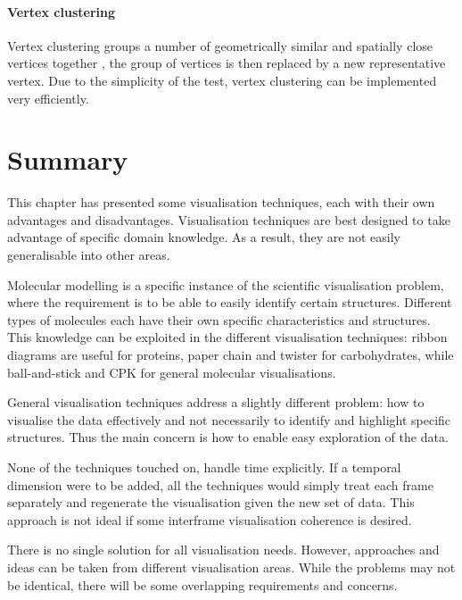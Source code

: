 
\paragraph{Vertex clustering}

Vertex clustering groups a number of geometrically similar and spatially close
vertices together \citep{rossignac93}, the group of vertices is then replaced
by a new representative vertex. Due to the simplicity of the test, vertex
clustering can be implemented very efficiently.



\section{Summary}
\label{sec:background_summary}

This chapter has presented some visualisation techniques, each with their own
advantages and disadvantages. Visualisation techniques are best designed to
take advantage of specific domain knowledge. As a result, they are not easily
generalisable into other areas.

Molecular modelling is a specific instance of the scientific visualisation
problem, where the requirement is to be able to easily identify certain
structures. Different types of molecules each have their own specific
characteristics and structures. This knowledge can be exploited in the
different visualisation techniques: ribbon diagrams are useful for proteins,
paper chain and twister for carbohydrates, while ball-and-stick and CPK for
general molecular visualisations.

General visualisation techniques address a slightly different problem: how to
visualise the data effectively and not necessarily to identify and highlight
specific structures. Thus the main concern is how to enable easy exploration of
the data.

None of the techniques touched on, handle time explicitly. If a temporal
dimension were to be added, all the techniques would simply treat each frame
separately and regenerate the visualisation given the new set of data. This
approach is not ideal if some interframe visualisation coherence is desired.

There is no single solution for all visualisation needs. However, approaches and
ideas can be taken from different visualisation areas. While the problems may
not be identical, there will be some overlapping requirements and concerns.



